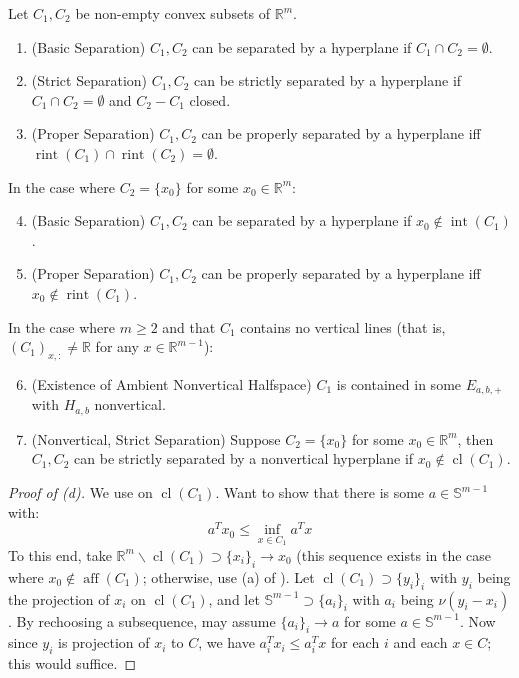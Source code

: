 \begin{prop}\label{prop:015-hyperplane-sep}
	Let $C_1,C_2$ be non-empty convex subsets of $\mathbb{R}^m$.
	\begin{enumerate}[label=(\alph*)]
		\item (Basic Separation) $C_1,C_2$ can be separated by a hyperplane if $C_1\cap C_2=\emptyset$.
		\item (Strict Separation) $C_1,C_2$ can be strictly separated by a hyperplane if $C_1\cap C_2=\emptyset$ and $C_2-C_1$ closed.
		\item (Proper Separation) $C_1,C_2$ can be properly separated by a hyperplane iff $\operatorname{rint}(C_1)\cap \operatorname{rint}(C_2)=\emptyset$.
	\end{enumerate}
	In the case where $C_2=\{x_0\}$ for some $x_0\in \mathbb{R}^m$:
	\begin{enumerate}[label=(\alph*)]
		\setcounter{enumi}{3}
		\item (Basic Separation) $C_1,C_2$ can be separated by a hyperplane if $x_0\notin \operatorname{int}(C_1)$.
		\item (Proper Separation) $C_1,C_2$ can be properly separated by a hyperplane iff $x_0\notin \operatorname{rint}(C_1)$.
	\end{enumerate}
	In the case where $m\geq 2$ and that $C_1$ contains no vertical lines (that is, $(C_{1})_{x,:}\neq \mathbb{R}$ for any $x\in \mathbb{R}^{m-1}$):
	\begin{enumerate}[label=(\alph*)]
		\setcounter{enumi}{5}
		\item (Existence of Ambient Nonvertical Halfspace) $C_1$ is contained in some $E_{a,b,+}$ with $H_{a,b}$ nonvertical.
		\item (Nonvertical, Strict Separation) Suppose $C_2=\{x_0\}$ for some $x_0\in \mathbb{R}^m$, then $C_1,C_2$ can be strictly separated by a nonvertical hyperplane if $x_0\notin \operatorname{cl}(C_1)$.
	\end{enumerate}
\end{prop}

\begin{proof}[Proof of (d)]
	We use  on $\operatorname{cl}(C_1)$. Want to show that there is some $a\in \mathbb{S}^{m-1}$ with:
	\[
		a^Tx_0\leq \underset{x\in C_1}{\operatorname{inf}}a^Tx
	\]
	To this end, take $\mathbb{R}^m\smallsetminus \operatorname{cl}(C_1)\supset \{x_i\}_i\to x_0$ (this sequence exists in the case where $x_0\notin \operatorname{aff}(C_1)$; otherwise, use (a) of ). Let $\operatorname{cl}(C_1)\supset\{y_i\}_i$ with $y_i$ being the projection of $x_i$ on $\operatorname{cl}(C_1)$, and let $\mathbb{S}^{m-1}\supset \{a_i\}_i$ with $a_i$ being $\nu(y_i-x_i)$. By rechoosing a subsequence, may assume $\{a_i\}_i\to a$ for some $a\in \mathbb{S}^{m-1}$. Now since $y_i$ is projection of $x_i$ to $C$, we have $a_i^Tx_i\leq a_i^Tx$ for each $i$ and each $x\in C$; this would suffice.
\end{proof}

